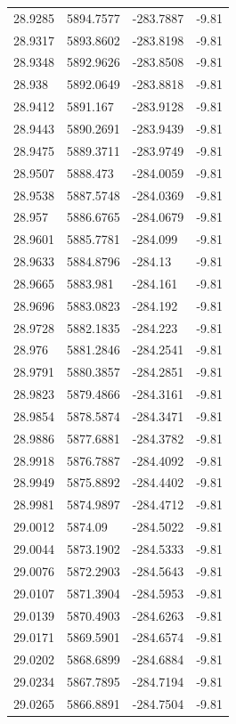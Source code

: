 \begin{table}[H]
\begin{tabular}{llll}
28.9285 & 5894.7577 & -283.7887 & -9.81 \\
28.9317 & 5893.8602 & -283.8198 & -9.81 \\
28.9348 & 5892.9626 & -283.8508 & -9.81 \\
28.938 & 5892.0649 & -283.8818 & -9.81 \\
28.9412 & 5891.167 & -283.9128 & -9.81 \\
28.9443 & 5890.2691 & -283.9439 & -9.81 \\
28.9475 & 5889.3711 & -283.9749 & -9.81 \\
28.9507 & 5888.473 & -284.0059 & -9.81 \\
28.9538 & 5887.5748 & -284.0369 & -9.81 \\
28.957 & 5886.6765 & -284.0679 & -9.81 \\
28.9601 & 5885.7781 & -284.099 & -9.81 \\
28.9633 & 5884.8796 & -284.13 & -9.81 \\
28.9665 & 5883.981 & -284.161 & -9.81 \\
28.9696 & 5883.0823 & -284.192 & -9.81 \\
28.9728 & 5882.1835 & -284.223 & -9.81 \\
28.976 & 5881.2846 & -284.2541 & -9.81 \\
28.9791 & 5880.3857 & -284.2851 & -9.81 \\
28.9823 & 5879.4866 & -284.3161 & -9.81 \\
28.9854 & 5878.5874 & -284.3471 & -9.81 \\
28.9886 & 5877.6881 & -284.3782 & -9.81 \\
28.9918 & 5876.7887 & -284.4092 & -9.81 \\
28.9949 & 5875.8892 & -284.4402 & -9.81 \\
28.9981 & 5874.9897 & -284.4712 & -9.81 \\
29.0012 & 5874.09 & -284.5022 & -9.81 \\
29.0044 & 5873.1902 & -284.5333 & -9.81 \\
29.0076 & 5872.2903 & -284.5643 & -9.81 \\
29.0107 & 5871.3904 & -284.5953 & -9.81 \\
29.0139 & 5870.4903 & -284.6263 & -9.81 \\
29.0171 & 5869.5901 & -284.6574 & -9.81 \\
29.0202 & 5868.6899 & -284.6884 & -9.81 \\
29.0234 & 5867.7895 & -284.7194 & -9.81 \\
29.0265 & 5866.8891 & -284.7504 & -9.81 \\

\end{tabular}
\end{table}
